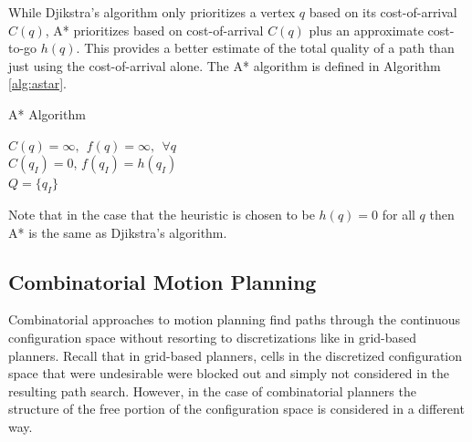 While Djikstra's algorithm only prioritizes a vertex $q$ based on its cost-of-arrival $C(q)$, A* prioritizes based on cost-of-arrival $C(q)$ plus an approximate cost-to-go $h(q)$. This provides a better estimate of the total quality of a path than just using the cost-of-arrival alone. The A* algorithm is defined in Algorithm \ref{alg:astar}.
\begin{algorithm}[ht]\caption{A* Algorithm} \label{alg:astar}
	$C(q) = \infty, \:\: f(q) = \infty, \:\:  \forall q$ \\
	$C(q_I) = 0$, $f(q_I) = h(q_I)$ \\
	$Q = \{q_I\}$ \\
\end{algorithm}
Note that in the case that the heuristic is chosen to be $h(q) = 0$ for all $q$ then A* is the same as Djikstra's algorithm.


\subsection{Combinatorial Motion Planning} 
Combinatorial approaches to motion planning find paths through the continuous configuration space without resorting to discretizations like in grid-based planners. Recall that in grid-based planners, cells in the discretized configuration space that were undesirable were blocked out and simply not considered in the resulting path search. However, in the case of combinatorial planners the structure of the free portion of the configuration space is considered in a different way.

